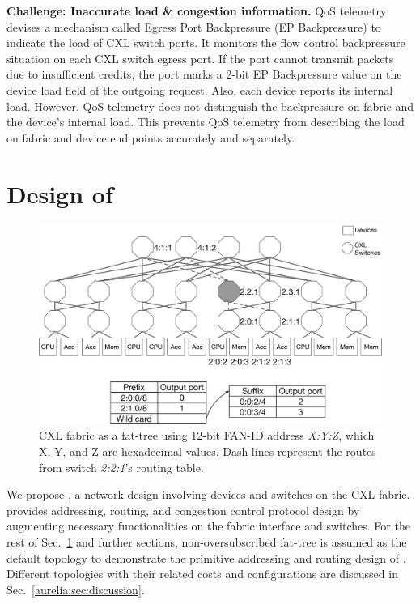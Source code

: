 \noindent \textbf{Challenge: Inaccurate load \& congestion information.}
QoS telemetry devises a mechanism called Egress Port Backpressure (EP Backpressure) to indicate the load of CXL switch ports.
%
It monitors the flow control backpressure situation on each CXL switch egress port. 
%
If the port cannot transmit packets due to insufficient credits, the port marks a 2-bit EP Backpressure value on the device load field of the outgoing request. 
%
Also, each device reports its internal load. 
%
However, QoS telemetry does not distinguish the backpressure on fabric and the device's internal load.
%
This prevents QoS telemetry from describing the load on fabric and device end points accurately and separately.
%
\section{Design of \aurelia}
\label{aurelia:sec:design}

\begin{figure}[t!]    
    \centering
    \includegraphics[width=0.9\columnwidth]{figure/aurelia/cxl-fat-tree-routing-table.eps}
    \caption{CXL fabric as a fat-tree using 12-bit FAN-ID address \emph{X:Y:Z}, which X, Y, and Z are hexadecimal values. Dash lines represent the routes from switch \emph{2:2:1}'s routing table.} 
    \label{fig:cxl-fabric-overview}
\end{figure}

We propose \aurelia, a network design involving devices and switches on the CXL fabric. 
%
\aurelia provides addressing, routing, and congestion control protocol design by augmenting necessary functionalities on the fabric interface and switches.
%
For the rest of Sec.~\ref{aurelia:sec:design} and further sections, non-oversubscribed fat-tree is assumed as the default topology to demonstrate the primitive addressing and routing design of \aurelia.
% 
%
Different topologies with their related costs and configurations are discussed in Sec.~\ref{aurelia:sec:discussion}.

